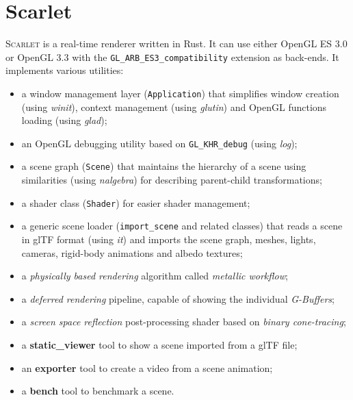 \documentclass[11pt,a4paper]{report}
\begin{document}
\chapter{Scarlet}
\textsc{Scarlet} is a real-time renderer written in Rust. It can use either OpenGL ES 3.0 or OpenGL 3.3 with the \texttt{GL\_ARB\_ES3\_compatibility} extension as back-ends. It implements various utilities:
\begin{itemize}
	\item a window management layer (\texttt{Application}) that simplifies window creation (using \textit{winit}), context management (using \textit{glutin}) and OpenGL functions loading (using \textit{glad});
	\item an OpenGL debugging utility based on \texttt{GL\_KHR\_debug} (using \textit{log});
	\item a scene graph (\texttt{Scene}) that maintains the hierarchy of a scene using similarities (using \textit{nalgebra}) for describing parent-child transformations;
	\item a shader class (\texttt{Shader}) for easier shader management;
	\item a generic scene loader (\texttt{import\_scene} and related classes) that reads a scene in glTF format (using \textit{it}) and imports the scene graph, meshes, lights, cameras, rigid-body animations and albedo textures;
	\item a \textit{physically based rendering} algorithm called \textit{metallic workflow};
	\item a \textit{deferred rendering} pipeline, capable of showing the individual \textit{G-Buffers};
	\item a \textit{screen space reflection} post-processing shader based on \textit{binary cone-tracing};
	\item a \textbf{static\_viewer} tool to show a scene imported from a glTF file;
	\item an \textbf{exporter} tool to create a video from a scene animation;
	\item a \textbf{bench} tool to benchmark a scene.
\end{itemize}
\end{document}
